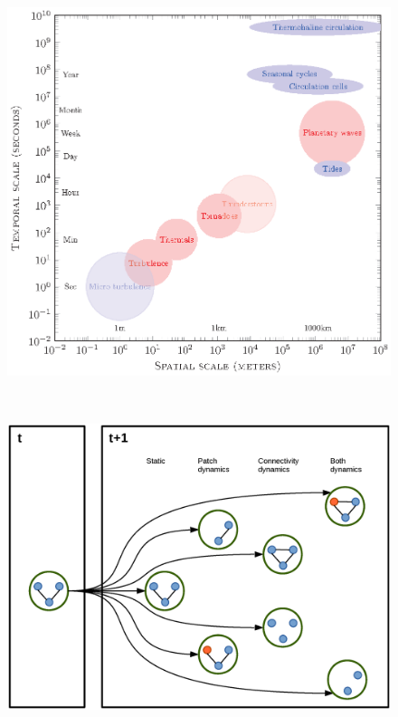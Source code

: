 \documentclass[12pt]{article}
\begin{document}
\begin{figure}[hb!]
\vspace{-2 in}
\hspace{-2 in}\includegraphics[width=9in]{./figures/Figure1v2.eps}
\caption{}
\vspace{-4 in}
\label{fig:Figure1}
\end{figure}

\begin{figure}
\hspace{0.75 in}\includegraphics[height=4in,width=5in]{./figures/Figure2.eps}
\caption{}
\label{fig:Figure2}
\end{figure}
\end{document}
